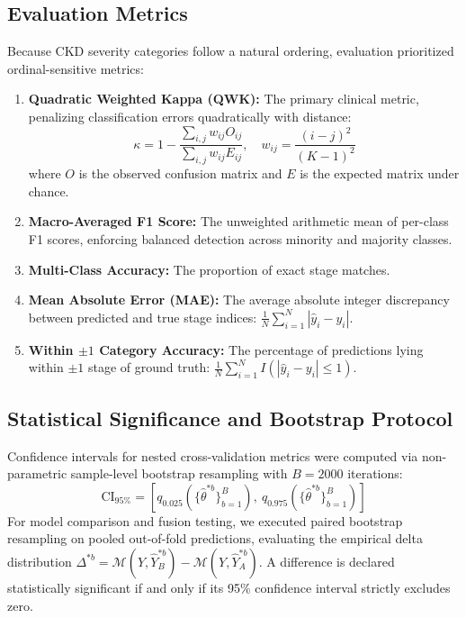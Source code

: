 \documentclass[conference]{IEEEtran}
\begin{document}
\subsection{Evaluation Metrics}
Because CKD severity categories follow a natural ordering, evaluation prioritized ordinal-sensitive metrics:
\begin{enumerate}
    \item \textbf{Quadratic Weighted Kappa (QWK):} The primary clinical metric, penalizing classification errors quadratically with distance:
    \begin{equation}
    \kappa = 1 - \frac{\sum_{i,j} w_{ij} O_{ij}}{\sum_{i,j} w_{ij} E_{ij}}, \quad w_{ij} = \frac{(i - j)^2}{(K - 1)^2}
    \end{equation}
    where $O$ is the observed confusion matrix and $E$ is the expected matrix under chance.
    \item \textbf{Macro-Averaged F1 Score:} The unweighted arithmetic mean of per-class F1 scores, enforcing balanced detection across minority and majority classes.
    \item \textbf{Multi-Class Accuracy:} The proportion of exact stage matches.
    \item \textbf{Mean Absolute Error (MAE):} The average absolute integer discrepancy between predicted and true stage indices: $\frac{1}{N} \sum_{i=1}^N |\hat{y}_i - y_i|$.
    \item \textbf{Within $\pm 1$ Category Accuracy:} The percentage of predictions lying within $\pm 1$ stage of ground truth: $\frac{1}{N} \sum_{i=1}^N I(|\hat{y}_i - y_i| \le 1)$.
\end{enumerate}

\subsection{Statistical Significance and Bootstrap Protocol}
Confidence intervals for nested cross-validation metrics were computed via non-parametric sample-level bootstrap resampling with $B = 2000$ iterations:
\begin{equation}
\text{CI}_{95\%} = \left[ q_{0.025}\left(\{\hat{\theta}^{*b}\}_{b=1}^B\right), \ q_{0.975}\left(\{\hat{\theta}^{*b}\}_{b=1}^B\right) \right]
\end{equation}
For model comparison and fusion testing, we executed paired bootstrap resampling on pooled out-of-fold predictions, evaluating the empirical delta distribution $\Delta^{*b} = \mathcal{M}(Y, \hat{Y}_B^{*b}) - \mathcal{M}(Y, \hat{Y}_A^{*b})$. A difference is declared statistically significant if and only if its 95\% confidence interval strictly excludes zero.
\end{document}
